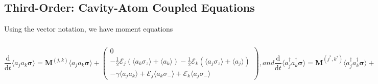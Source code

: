 \documentclass{article}
\newcommand{\ddt}[1][]{\frac{\mathrm{d} #1}{\mathrm{d}t}}
\begin{document}
\subsection{Third-Order: Cavity-Atom Coupled Equations}

Using the vector notation, we have moment equations

\begin{subequations}
	\begin{equation}
		\ddt \langle a_{j} a_{k} \bm{\sigma} \rangle = \bm{M}^{(j, k)} \langle a_{j} a_{k} \bm{\sigma} \rangle + 
		\begin{pmatrix}
			0 \\
			-\frac{1}{2} \mathcal{E}_{j} \left( \langle a_{k} \sigma_{z} \rangle + \langle a_{k} \rangle \right) - \frac{1}{2} \mathcal{E}_{k} \left( \langle a_{j} \sigma_{z} \rangle + \langle a_{j} \rangle \right) \\
			-\gamma \langle a_{j} a_{k} \rangle + \mathcal{E}_{j} \langle a_{k} \sigma_{-} \rangle + \mathcal{E}_{k} \langle a_{j} \sigma_{-} \rangle
		\end{pmatrix},
	\end{equation}
	and
	\begin{equation}
		\ddt \langle a^{\dagger}_{j} a^{\dagger}_{k} \bm{\sigma} \rangle = \bm{M}^{(j^{*}, k^{*})} \langle a^{\dagger}_{j} a^{\dagger}_{k} \bm{\sigma} \rangle + 
		\begin{pmatrix}
			-\frac{1}{2} \mathcal{E}_{j}^{*} \left( \langle a^{\dagger}_{k} \sigma_{z} \rangle + \langle a^{\dagger}_{k} \rangle \right) - \frac{1}{2} \mathcal{E}_{k}^{*} \left( \langle a^{\dagger}_{j} \sigma_{z} \rangle + \langle a^{\dagger}_{j} \rangle \right) \\
			0 \\
			-\gamma \langle a^{\dagger}_{j} a^{\dagger}_{k} \rangle + \mathcal{E}_{j}^{*} \langle a^{\dagger}_{k} \sigma_{+} \rangle + \mathcal{E}_{k}^{*} \langle a^{\dagger}_{j} \sigma_{+} \rangle
		\end{pmatrix},
	\end{equation}
	and
	\begin{equation}
	\ddt \langle a^{\dagger}_{j} a_{k} \bm{\sigma} \rangle = \bm{M}^{(j^{*}, k)} \langle a^{\dagger}_{j} a_{k} \bm{\sigma} \rangle + 
	\begin{pmatrix}
		-\frac{1}{2} \mathcal{E}_{j}^{*} \left( \langle a_{k} \sigma_{z} \rangle + \langle a_{k} \rangle \right) \\
		-\frac{1}{2} \mathcal{E}_{k} \left( \langle a^{\dagger}_{j} \sigma_{z} \rangle + \langle a^{\dagger}_{j} \rangle \right) \\
		-\gamma \langle a^{\dagger}_{j} a_{k} \rangle + \mathcal{E}_{j}^{*} \langle a_{k} \sigma_{+} \rangle + \mathcal{E}_{k} \langle a^{\dagger}_{j} \sigma_{-} \rangle
	\end{pmatrix},
	\end{equation}
\end{subequations}
\end{document}
